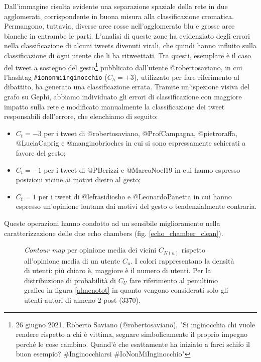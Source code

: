     Dall’immagine risulta evidente una separazione spaziale della rete in due agglomerati, corrispondente in buona misura alla classificazione cromatica. Permangono, tuttavia, diverse aree rosse nell’agglomerato blu e grosse aree bianche in entrambe le parti. L'analisi di queste zone ha evidenziato degli errori nella classificazione di alcuni tweets divenuti virali, che quindi hanno influito sulla classificazione di ogni utente che li ha ritweettati.
    Tra questi, esemplare è il caso del tweet a sostegno del gesto\footnote{ 26 giugno 2021, Roberto Saviano (@robertosaviano), "Si inginocchia chi vuole rendere rispetto a chi è vittima, segnare simbolicamente il proprio impegno perché le cose cambino. Quand'è che esattamente ha iniziato a farci schifo il buon esempio?     \#Inginocchiarsi \#IoNonMiInginocchio"} pubblicato dall'utente @robertosaviano, in cui l'hashtag \texttt{\#iononmiinginocchio} ($C_{h} = +3$), utilizzato per fare riferimento al dibattito, ha generato una classificazione errata. Tramite un'ispezione visiva del grafo su Gephi, abbiamo individuato gli errori di classificazione con maggiore impatto sulla rete e modificato manualmente la classificazione dei tweet responsabili dell'errore, che elenchiamo di seguito:
    
    \begin{itemize}
        \item $C_{t}=-3$ per i tweet di @robertosaviano, @ProfCampagna, @pietroraffa, @LuciaCaprig e @manginobrioches in cui si sono espressamente schierati a favore del gesto; 
        \item $C_{t}=-1$ per i tweet di @PBerizzi e @MarcoNoel19 in cui hanno espresso posizioni vicine ai motivi dietro al gesto;
        \item  $C_{t}=1$ per i tweet di @lefrasidiosho e @LeonardoPanetta in cui hanno espresso un'opinione lontana dai motivi del gesto o tendenzialmente contraria.
    \end{itemize}
    
    Queste operazioni hanno condotto ad un sensibile miglioramento nella caratterizzazione delle due echo chambers (fig. \ref{echo_chamber_clean}). 
    
    \begin{center}
        \vspace{1mm}
        \begin{figure}[h!]
        \caption{\textit{Contour map} per opinione media dei vicini $C_{N(u)}$ rispetto all'opinione media di un utente $C_{u}$. I colori rappresentano la densità di utenti: più chiaro è, maggiore è il numero di utenti. Per la distribuzione di probabilità di $C_{U}$ fare riferimento al penultimo grafico in figura \ref{almenotot} in quanto vengono considerati solo gli utenti autori di almeno 2 post (3370).}
        \label{Contourmaps}
        \end{figure}
    \end{center}
    \vspace{-5mm}
    
